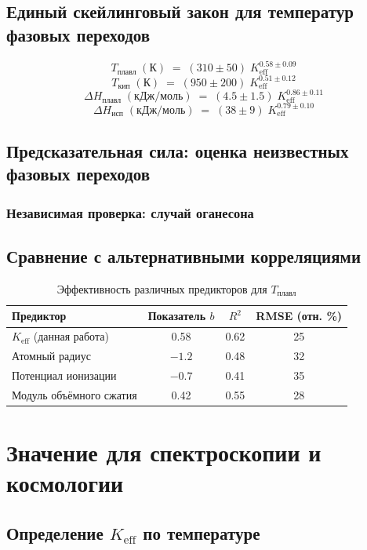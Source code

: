 \documentclass[12pt,a4paper]{article}
\theoremstyle{remark}
\newcommand{\Keff}{K_{\mathrm{eff}}}
\begin{document}
	\subsection{Единый скейлинговый закон для температур фазовых переходов}
	\[
	\boxed{T_{\text{плавл}} \;(\mathrm{К}) \;=\; (310 \pm 50) \; \Keff^{0.58 \pm 0.09}}
	\]
	\[
	\boxed{T_{\text{кип}} \;(\mathrm{К}) \;=\; (950 \pm 200) \; \Keff^{0.51 \pm 0.12}}
	\]
	\[
	\boxed{\Delta H_{\text{плавл}} \;(\mathrm{кДж/моль}) \;=\; (4.5 \pm 1.5) \; \Keff^{0.86 \pm 0.11}}
	\]
	\[
	\boxed{\Delta H_{\text{исп}} \;(\mathrm{кДж/моль}) \;=\; (38 \pm 9) \; \Keff^{0.79 \pm 0.10}}
	\]
	
	\subsection{Предсказательная сила: оценка неизвестных фазовых переходов}
	\subsubsection{Независимая проверка: случай оганесона}
	\subsection{Сравнение с альтернативными корреляциями}
	
	\begin{table}[htbp]
		\centering
		\caption{Эффективность различных предикторов для \(T_{\text{плавл}}\)}
		\label{tab:comparison}
		\begin{tabular}{@{}lccc@{}}
			\toprule
			\textbf{Предиктор} & \textbf{Показатель }\(b\) & \textbf{\(R^2\)} & \textbf{RMSE (отн. \%)} \\
			\midrule
			\(K_{\mathrm{eff}}\) (данная работа) & 0.58 & 0.62 & 25 \\
			Атомный радиус & \(-1.2\) & 0.48 & 32 \\
			Потенциал ионизации & \(-0.7\) & 0.41 & 35 \\
			Модуль объёмного сжатия & 0.42 & 0.55 & 28 \\
			\bottomrule
		\end{tabular}
	\end{table}
	
	\section{Значение для спектроскопии и космологии}
	\subsection{Определение \(\Keff\) по температуре}
\end{document}
